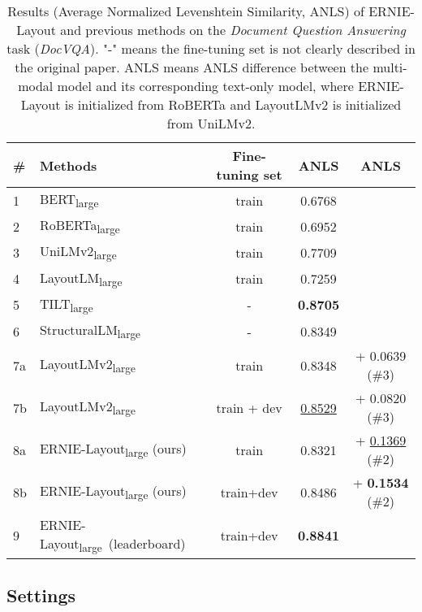 \documentclass[11pt]{article}
\begin{document}
\begin{table*}[t]
\centering
\small
\begin{tabular}{llccc}
\toprule
\# &\textbf{Methods}             &\textbf{Fine-tuning set}       &\textbf{ANLS} &\textbf{ANLS} \\
\midrule
1 & BERT\textsubscript{large}~\cite{liu2019roberta}     &train  &0.6768 &\\
2 & RoBERTa\textsubscript{large}~\cite{liu2019roberta}  &train  &0.6952 & \\
3 & UniLMv2\textsubscript{large}~\cite{bao2020unilmv2} &train &0.7709 & \\
\midrule
4 & LayoutLM\textsubscript{large}~\cite{xu2020layoutlm}         &train &0.7259 & \\
5 & TILT\textsubscript{large}~\cite{powalski2021going}          &-     &\textbf{0.8705} & \\
6 & StructuralLM\textsubscript{large}~\cite{li2021structurallm} &-     &0.8349 & \\
\midrule
7a & LayoutLMv2\textsubscript{large}~\cite{xu2021layoutlmv2} & train & 0.8348 & + 0.0639 (\#3) \\
7b & LayoutLMv2\textsubscript{large}~\cite{xu2021layoutlmv2}             & train + dev & \underline{0.8529} & + 0.0820 (\#3) \\
\midrule
\midrule
8a & ERNIE-Layout\textsubscript{large} (ours)   &train     &0.8321 & + \underline{0.1369} (\#2)\\ 
8b & ERNIE-Layout\textsubscript{large} (ours)   &train+dev &0.8486 & + \textbf{0.1534} (\#2) \\ 
\midrule
9 & ERNIE-Layout\textsubscript{large}~(leaderboard) &train+dev &\textbf{0.8841} & \\
\bottomrule
\end{tabular}
\caption{Results (Average Normalized Levenshtein Similarity, ANLS) of ERNIE-Layout and previous methods on the \emph{Document Question Answering} task (\emph{DocVQA}). "-" means the fine-tuning set is not clearly described in the original paper. ANLS means ANLS difference between the multi-modal model and its corresponding text-only model, where ERNIE-Layout is initialized from RoBERTa and LayoutLMv2 is initialized from UniLMv2.} 
\label{tab:main_result_docvqa}
\end{table*}


\subsection{Settings}
\end{document}
